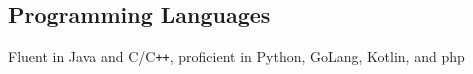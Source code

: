 \documentclass[../Resume.tex]{subfiles}
\begin{document}
    \subsection{Programming Languages}
    Fluent in Java and C/C\verb!++!, proficient in Python, GoLang, Kotlin, and php
    \vspace*{-4mm}
\end{document}
